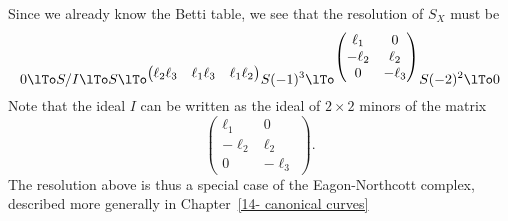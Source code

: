 \begin{example}
 Since we already know the Betti table, we see that the resolution
 of $S_{X}$ must be
$$
0\lTo S/I\lTo S
\lTo^{\begin{pmatrix}
\ell_2\ell_3&\ell_1\ell_3&\ell_1\ell_2
\end{pmatrix}}
 S(-1)^3
 \lTo^{\begin{pmatrix}
  \ell_1&0\\
  -\ell_2&\ell_2\\
 0&-\ell_3
 \end{pmatrix}}
 S(-2)^2
 \lTo 0
$$
Note that the
ideal $I$ can be written as the ideal of $2\times 2$ minors of the matrix
$$
 {\begin{pmatrix}
  \ell_1&0\\
  -\ell_2&\ell_2\\
 0&-\ell_3
 \end{pmatrix}}.
$$
The resolution above is thus a special case of the Eagon-Northcott complex, described more generally in Chapter~\ref{14- canonical curves}
\end{example}

